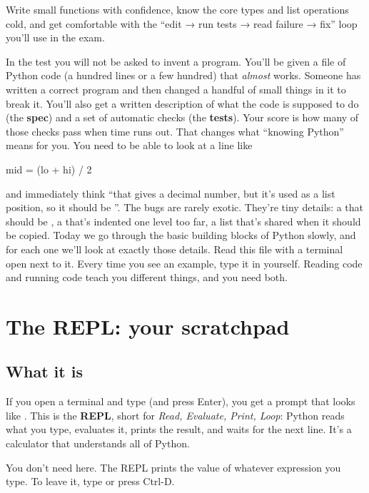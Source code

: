 \documentclass[10pt,a4paper]{article}
\begin{document}
\makecover
\setcounter{page}{2}
\makefrontmatter
\begin{goalbox}
Write small functions with confidence, know the core types and list operations cold, and get comfortable with the “edit → run tests → read failure → fix” loop you’ll use in the exam.
\end{goalbox}
\vspace{2pt}
In the test you will not be asked to invent a program. You’ll be given a file of Python code (a hundred lines or a few hundred) that \emph{almost} works. Someone has written a correct program and then changed a handful of small things in it to break it. You’ll also get a written description of what the code is supposed to do (the \textbf{spec}) and a set of automatic checks (the \textbf{tests}). Your score is how many of those checks pass when time runs out.
That changes what “knowing Python” means for you. You need to be able to look at a line like
\begin{pycode}
mid = (lo + hi) / 2
\end{pycode}
and immediately think “that gives a decimal number, but it’s used as a list position, so it should be \code{/\allowbreak{}/\allowbreak{}}”. The bugs are rarely exotic. They’re tiny details: a \code{\textless{}\allowbreak{}} that should be \code{\textless{}\allowbreak{}=\allowbreak{}}, a  that’s indented one level too far, a list that’s shared when it should be copied. Today we go through the basic building blocks of Python slowly, and for each one we’ll look at exactly those details.
Read this file with a terminal open next to it. Every time you see an example, type it in yourself. Reading code and running code teach you different things, and you need both.
\setcounter{section}{0}
\section{The REPL: your scratchpad}
\subsection{What it is}
If you open a terminal and type  (and press Enter), you get a prompt that looks like \code{\textgreater{}\allowbreak{}\textgreater{}\allowbreak{}\textgreater{}\allowbreak{}}. This is the \textbf{REPL}, short for \emph{Read, Evaluate, Print, Loop}: Python reads what you type, evaluates it, prints the result, and waits for the next line. It’s a calculator that understands all of Python.
You don’t need  here. The REPL prints the value of whatever expression you type. To leave it, type  or press Ctrl-D.
\end{document}
